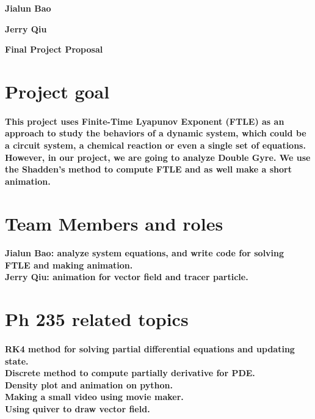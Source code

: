 \documentclass[12pt]{article}
\begin{document}
\textbf{\large Jialun Bao} 

\textbf{\large Jerry Qiu } \\

\begin{center}
\textbf{\LARGE Final Project Proposal}
\end{center}

\section{Project goal} 
\paragraph{
\indent This project uses Finite-Time Lyapunov Exponent (FTLE) as an approach to study the behaviors of a dynamic system, which could be a circuit system, a chemical reaction or even a single set of equations. However, in our project, we are going to analyze Double Gyre. We use the Shadden's method to compute FTLE and as well make a short animation.\\
	}
	



\section{Team Members and roles}
\paragraph{Jialun Bao:
 analyze system equations, and write code for solving FTLE and making animation.\\
Jerry Qiu:  animation for vector field and tracer particle.\\
}	



\section{Ph 235 related topics}
\paragraph{	
RK4 method for solving partial differential equations and updating state.\\
Discrete method to compute partially derivative for PDE.\\
Density plot and animation on python.\\
Making a small video using movie maker. \\ 
Using quiver to draw vector field.\\
}
\end{document}
